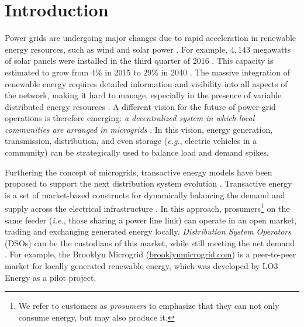 \section{Introduction}


Power grids are undergoing major changes due to rapid acceleration in
renewable energy resources, such as wind and solar power
\cite{5430489}.
For example, $4,\!143$ megawatts of solar panels were installed in the
third quarter of 2016 \cite{seia}. This capacity is estimated to grow
from 4\% in 2015 to 29\% in 2040 \cite{Randal}. 
The massive integration of renewable energy requires detailed
information and visibility into all aspects of the network, making it
hard to manage, especially in the presence of variable distributed
energy resources \cite{7452738}. A different vision for the future of
power-grid operations is therefore emerging: {\em a decentralized
  system in which local communities are arranged in microgrids}
\cite{rahimi2012transactive}. In this vision, energy generation,
transmission, distribution, and even storage (\emph{e.g.}, electric
vehicles in a community) can be strategically used to balance load and
demand spikes.

Furthering the concept of microgrids, transactive energy models have
been proposed to support the next distribution system evolution
\cite{kok2016society,melton2013gridwise}. Transactive %
energy is a set of market-based constructs for dynamically balancing
the demand and supply across the electrical infrastructure
\cite{melton2013gridwise}. In this approach, prosumers\footnote{We
  refer to customers as \emph{prosumers} to emphasize that they can
  not only consume energy, but may also produce it.} on the same
feeder (\emph{i.e.}, those sharing a power line link) can operate in
an open market, trading and exchanging generated energy
locally. \emph{Distribution System Operators} (DSOs) can be the
custodians of this market, while still meeting the net demand
\cite{7462854}. For example, the Brooklyn Microgrid
(\url{brooklynmicrogrid.com}) is a peer-to-peer market for locally
generated renewable energy, which was developed by LO3 Energy as a pilot project.

